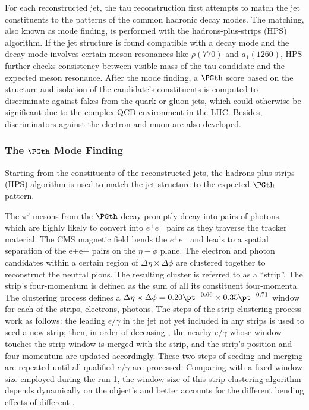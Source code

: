 For each reconstructed jet, the tau reconstruction first attempts to match the jet constituents to the patterns of the common hadronic decay modes. The matching, also known as mode finding, is performed with the hadrons-plus-strips (HPS) algorithm. If the jet structure is found compatible with a decay mode and the decay mode involves certain meson resonances like $\rho(770)$ and $a_1(1260)$, HPS further checks consistency between visible mass of the tau candidate and the expected meson resonance. After the mode finding, a $\PGth$ score based on the structure and isolation of the candidate's constituents is computed to discriminate against fakes from the quark or gluon jets, which could otherwise be significant due to the complex QCD environment in the LHC. Besides, discriminators against the electron and muon are also developed.


\subsubsection{The $\PGth$ Mode Finding}

Starting from the constituents of the reconstructed jets, the hadrons-plus-strips (HPS) algorithm is used to match the jet structure to the expected $\PGth$ pattern. 

The $\pi^0$ mesons from the $\PGth$ decay promptly decay into pairs of photons, which are highly likely to convert into $e^+e^-$ pairs as they traverse the tracker material. The CMS magnetic field bends the $e^+e^-$ and leads to a spatial separation of the e+e− pairs on the $\eta-\phi$ plane. The electron and photon candidates within a certain region of $\Delta\eta \times \Delta \phi$  are clustered together to reconstruct the neutral pions. The resulting cluster is referred to as a “strip”. The strip's four-momentum is defined as the sum of all its constituent four-momenta. The clustering process defines a $\Delta\eta \times \Delta \phi = 0.20\pt^{-0.66} \times 0.35 \pt^{-0.71}$ window for each of the strips, electrons, photons. The steps of the strip clustering process work as follows: the leading $e/\gamma$ in the jet not yet included in any strips is used to seed a new strip; then, in order of deceasing \pt, the nearby $e/\gamma$ whose window touches the strip window is merged with the strip, and the strip's position and four-momentum are updated accordingly. These two steps of seeding and merging are repeated until all qualified $e/\gamma$ are processed. Comparing with a fixed window size employed during the run-1, the window size of this strip clustering algorithm depends dynamically on the object's \pt and better accounts for the different bending effects of different \pt.

